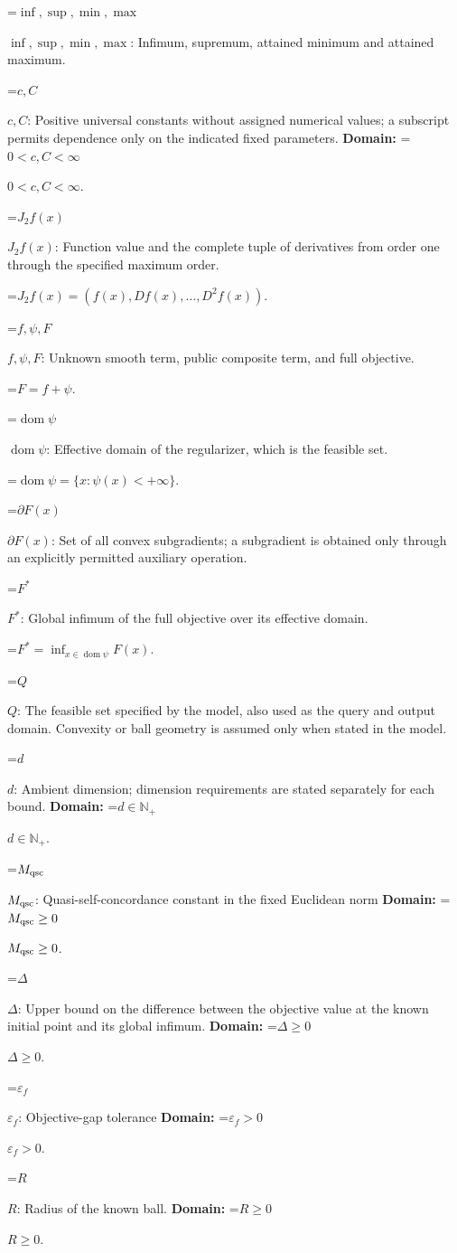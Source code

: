\documentclass[10pt,a4paper]{article}
\newcommand{\AtlasMath}[1]{\par\begingroup\centering\setbox0=\hbox{$\displaystyle #1$}\ifdim\wd0>1.4\linewidth\typeout{ATLAS WIDE FORMULA: \the\wd0}\fi\ifdim\wd0>\linewidth\resizebox{\linewidth}{!}{\box0}\else\box0\fi\par\endgroup}
\newcommand{\AtlasInlineMath}[1]{\begingroup\setbox0=\hbox{$#1$}\ifdim\wd0>.4\linewidth\endgroup\AtlasMath{#1}\else\endgroup$#1$\fi}
\begin{document}
\AtlasInlineMath{\inf,\sup,\min,\max}: Infimum, supremum, attained minimum and attained maximum.

\AtlasInlineMath{c,C}: Positive universal constants without assigned numerical values; a subscript permits dependence only on the indicated fixed parameters. \textbf{Domain:} \AtlasInlineMath{0<c,C<\infty}.

\AtlasInlineMath{J_{2}f(x)}: Function value and the complete tuple of derivatives from order one through the specified maximum order.


\AtlasMath{J_{2}f(x)=(f(x),Df(x),\ldots,D^{2}f(x)).}


\AtlasInlineMath{f,\psi,F}: Unknown smooth term, public composite term, and full objective.


\AtlasMath{F=f+\psi.}


\AtlasInlineMath{\operatorname{dom}\psi}: Effective domain of the regularizer, which is the feasible set.


\AtlasMath{\operatorname{dom}\psi=\{x:\psi(x)<+\infty\}.}


\AtlasInlineMath{\partial F(x)}: Set of all convex subgradients; a subgradient is obtained only through an explicitly permitted auxiliary operation.

\AtlasInlineMath{F^*}: Global infimum of the full objective over its effective domain.


\AtlasMath{F^*=\inf_{x\in\operatorname{dom}\psi}F(x).}


\AtlasInlineMath{Q}: The feasible set specified by the model, also used as the query and output domain. Convexity or ball geometry is assumed only when stated in the model.

\AtlasInlineMath{d}: Ambient dimension; dimension requirements are stated separately for each bound. \textbf{Domain:} \AtlasInlineMath{d\in\mathbb{N}_{+}}.

\AtlasInlineMath{M_{\rm qsc}}: Quasi-self-concordance constant in the fixed Euclidean norm \textbf{Domain:} \AtlasInlineMath{M_{\rm qsc}\ge0}.

\AtlasInlineMath{\Delta}: Upper bound on the difference between the objective value at the known initial point and its global infimum. \textbf{Domain:} \AtlasInlineMath{\Delta\ge0}.

\AtlasInlineMath{\varepsilon_f}: Objective-gap tolerance \textbf{Domain:} \AtlasInlineMath{\varepsilon_f>0}.

\AtlasInlineMath{R}: Radius of the known ball. \textbf{Domain:} \AtlasInlineMath{R\ge0}.
\end{document}

